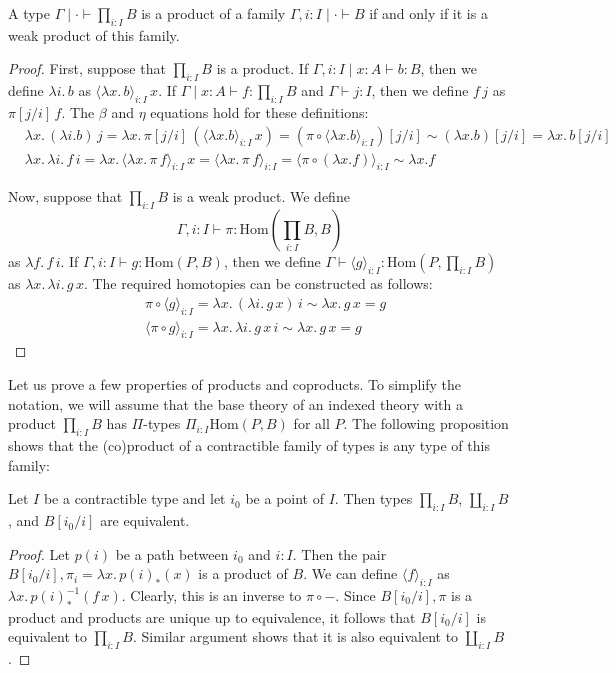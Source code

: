 \documentclass[reqno]{amsart}
\theoremstyle{definition}
\theoremstyle{remark}
\newcommand{\ob}{}
\newcommand{\fs}[1]{\mathrm{#1}}
\newcommand{\Hom}{\fs{Hom}}
\newcommand{\sym}[1]{#1^{-1}}
\numberwithin{figure}{section}
\begin{document}
\begin{prop}
A type $\Gamma \mid \cdot \vdash \prod_{i : I} B$ is a product of a family $\Gamma, i : I \mid \cdot \vdash B \ob$ if and only if it is a weak product of this family.
\end{prop}
\begin{proof}
First, suppose that $\prod_{i : I} B$ is a product.
If $\Gamma, i : I \mid x : A \vdash b : B$, then we define $\lambda i.\,b$ as $\langle \lambda x.\,b \rangle_{i : I}\,x$.
If $\Gamma \mid x : A \vdash f : \prod_{i : I} B$ and $\Gamma \vdash j : I$, then we define $f\,j$ as $\pi[j/i]\,f$.
The $\beta$ and $\eta$ equations hold for these definitions:
\begin{align*}
& \lambda x.\,(\lambda i.b)\,j = \lambda x.\,\pi[j/i]\,(\langle \lambda x.b \rangle_{i : I}\,x) = (\pi \circ \langle \lambda x.b \rangle_{i : I})[j/i] \sim (\lambda x.b)[j/i] = \lambda x.\,b[j/i] \\
& \lambda x.\,\lambda i.\,f\,i = \lambda x.\,\langle \lambda x.\,\pi\,f \rangle_{i : I}\,x = \langle \lambda x.\,\pi\,f \rangle_{i : I} = \langle \pi \circ (\lambda x.f) \rangle_{i : I} \sim \lambda x.f
\end{align*}

Now, suppose that $\prod_{i : I} B$ is a weak product.
We define
\[ \Gamma, i : I \vdash \pi : \Hom(\prod_{i : I} B, B) \]
as $\lambda f.\,f\,i$.
If $\Gamma, i : I \vdash g : \Hom(P,B)$, then we define $\Gamma \vdash \langle g \rangle_{i : I} : \Hom(P, \prod_{i : I} B)$ as $\lambda x.\,\lambda i.\,g\,x$.
The required homotopies can be constructed as follows:
\begin{align*}
& \pi \circ \langle g \rangle_{i : I} = \lambda x.\,(\lambda i.\,g\,x)\,i \sim \lambda x.\,g\,x = g \\
& \langle \pi \circ g \rangle_{i : I} = \lambda x.\,\lambda i.\,g\,x\,i \sim \lambda x.\,g\,x = g
\end{align*}
\end{proof}

Let us prove a few properties of products and coproducts.
To simplify the notation, we will assume that the base theory of an indexed theory with a product $\prod_{i : I} B$ has $\Pi$-types $\Pi_{i : I} \Hom(P,B)$ for all $P$.
The following proposition shows that the (co)product of a contractible family of types is any type of this family:

\begin{prop}
Let $I$ be a contractible type and let $i_0$ be a point of $I$.
Then types $\prod_{i : I} B$, $\coprod_{i : I} B$, and $B[i_0/i]$ are equivalent.
\end{prop}
\begin{proof}
Let $p(i)$ be a path between $i_0$ and $i : I$.
Then the pair $B[i_0/i], \pi_i = \lambda x.\,p(i)_*(x)$ is a product of $B$.
We can define $\langle f \rangle_{i : I}$ as $\lambda x.\,\sym{p(i)}_*(f\,x)$.
Clearly, this is an inverse to $\pi \circ -$.
Since $B[i_0/i],\pi$ is a product and products are unique up to equivalence, it follows that $B[i_0/i]$ is equivalent to $\prod_{i : I} B$.
Similar argument shows that it is also equivalent to $\coprod_{i : I} B$.
\end{proof}
\end{document}
